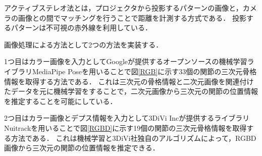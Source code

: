\documentclass[a4j, fleqn, 12pt]{jsreport}
\begin{document}
アクティブステレオ法とは，プロジェクタから投影するパターンの画像と，カメラの画像との間でマッチングを行うことで距離を計測する方式である．
投影するパターンは不可視の赤外線を利用している．

画像処理による方法として2つの方法を実装する．

1つ目はカラー画像を入力としてGoogleが提供するオープンソースの機械学習ライブラリMediaPipe Pose\cite{mediapipe}を用いることで図\ref{RGB}に示す33個の関節の三次元骨格情報を取得する方法である．
これは三次元の骨格情報と二次元画像を関連付けたデータを元に機械学習をすることで，二次元画像から三次元の関節の位置情報を推定することを可能にしている．

2つ目はカラー画像とデプス情報を入力として3DiVi Incが提供するライブラリNuitrack\cite{nuitrack}を用いることで図\ref{RGBD}に示す19個の関節の三次元骨格情報を取得する方法である．
これは機械学習と3DiVi社独自のアルゴリズムによって，RGBD画像から三次元の関節の位置情報を推定できる．
\end{document}
